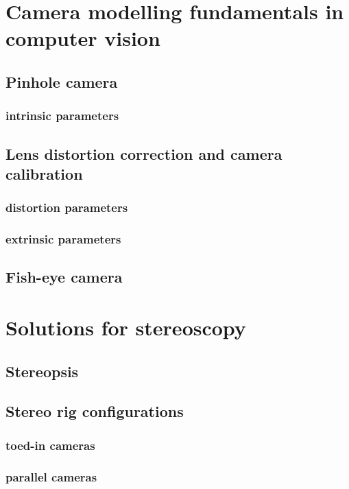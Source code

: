 

\section{Camera modelling fundamentals in computer vision}

\subsection{Pinhole camera}
\subsubsection{intrinsic parameters}

\subsection{Lens distortion correction and camera calibration}
\subsubsection{distortion parameters}
\subsubsection{extrinsic parameters}

\subsection{Fish-eye camera}


\section{Solutions for stereoscopy}

\subsection{Stereopsis}

\subsection{Stereo rig configurations}

\subsubsection{toed-in cameras}
\subsubsection{parallel cameras}
